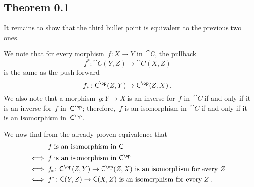 \subsection*{Theorem 0.1}

It remains to show that the third bullet point is equivalent to the previous two ones.

We note that for every morphism~$f \colon X \to Y$ in~$\cat{C}$, the pullback
\[
	f^* \colon \cat{C}(Y, Z) \to \cat{C}(X, Z)
\]
is the same as the push-forward
\[
	f_* \colon \cat{C}^{\op}(Z, Y) \to \cat{C}^{\op}(Z, X) \,.
\]
We also note that a morphism~$g \colon Y \to X$ is an inverse for~$f$ in~$\cat{C}$ if and only if it is an inverse for~$f$ in~$\cat{C}^{\op}$;
therefore,~$f$ is an isomorphism in~$\cat{C}$ if and only if it is an isomorphism in~$\cat{C}^{\op}$.

We now find from the already proven equivalence that
\begin{align*}
	{}&
	\text{$f$ is an isomorphism in~$\cat{C}$}
	\\
	\iff{}&
	\text{$f$ is an isomorphism in~$\cat{C}^{\op}$}
	\\
	\iff{}&
	\text{$f_* \colon \cat{C}^{\op}(Z, Y) \to \cat{C}^{\op}(Z, X)$ is an isomorphism for every~$Z$}
	\\
	\iff{}&
	\text{$f^* \colon \cat{C}(Y, Z) \to \cat{C}(X, Z)$ is an isomorphism for every~$Z$} \,.
\end{align*}
